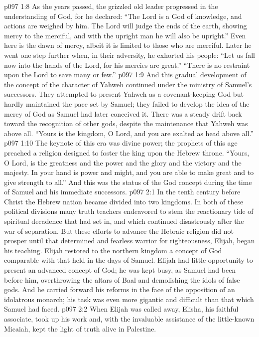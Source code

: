 \vs p097 1:8 As the years passed, the grizzled old leader progressed in the understanding of God, for he declared: “The Lord is a God of knowledge, and actions are weighed by him. The Lord will judge the ends of the earth, showing mercy to the merciful, and with the upright man he will also be upright.” Even here is the dawn of mercy, albeit it is limited to those who are merciful. Later he went one step further when, in their adversity, he exhorted his people: “Let us fall now into the hands of the Lord, for his mercies are great.” “There is no restraint upon the Lord to save many or few.”
\pc \vs p097 1:9 And this gradual development of the concept of the character of Yahweh continued under the ministry of Samuel’s successors. They attempted to present Yahweh as a covenant\hyp{}keeping God but hardly maintained the pace set by Samuel; they failed to develop the idea of the mercy of God as Samuel had later conceived it. There was a steady drift back toward the recognition of other gods, despite the maintenance that Yahweh was above all. “Yours is the kingdom, O Lord, and you are exalted as head above all.”
\vs p097 1:10 The keynote of this era was divine power; the prophets of this age preached a religion designed to foster the king upon the Hebrew throne. “Yours, O Lord, is the greatness and the power and the glory and the victory and the majesty. In your hand is power and might, and you are able to make great and to give strength to all.” And this was the status of the God concept during the time of Samuel and his immediate successors.
\vs p097 2:1 In the tenth century before Christ the Hebrew nation became divided into two kingdoms. In both of these political divisions many truth teachers endeavored to stem the reactionary tide of spiritual decadence that had set in, and which continued disastrously after the war of separation. But these efforts to advance the Hebraic religion did not prosper until that determined and fearless warrior for righteousness, Elijah, began his teaching. Elijah restored to the northern kingdom a concept of God comparable with that held in the days of Samuel. Elijah had little opportunity to present an advanced concept of God; he was kept busy, as Samuel had been before him, overthrowing the altars of Baal and demolishing the idols of false gods. And he carried forward his reforms in the face of the opposition of an idolatrous monarch; his task was even more gigantic and difficult than that which Samuel had faced.
\vs p097 2:2 When Elijah was called away, Elisha, his faithful associate, took up his work and, with the invaluable assistance of the little\hyp{}known Micaiah, kept the light of truth alive in Palestine.
